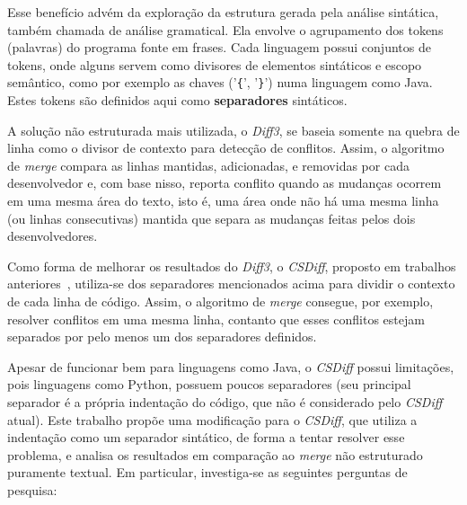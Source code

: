 Esse benefício advém da exploração da estrutura gerada pela análise sintática,
também chamada de análise gramatical. Ela envolve o agrupamento dos tokens
(palavras) do programa fonte em frases. Cada linguagem possui conjuntos de
tokens, onde alguns servem como divisores de elementos sintáticos e escopo
semântico, como por exemplo as chaves ('\verb|{|', '\verb|}|') numa linguagem como Java.
Estes tokens são definidos aqui como
\textbf{separadores} sintáticos.

A solução não estruturada mais utilizada, o \emph{Diff3}, se baseia somente na
quebra de linha como o divisor de contexto para detecção de conflitos. Assim, o
algoritmo de \emph{merge} compara as linhas mantidas, adicionadas, e removidas
por cada desenvolvedor e, com base nisso, reporta conflito quando as mudanças
ocorrem em uma mesma área do texto, isto é, uma área onde não há uma mesma
linha (ou linhas consecutivas) mantida que separa as mudanças feitas pelos dois
desenvolvedores.

Como forma de melhorar os resultados do \emph{Diff3}, o \emph{CSDiff}, proposto
em trabalhos anteriores~\cite{clem21}, utiliza-se dos separadores mencionados
acima para dividir o contexto de cada linha de código. Assim, o algoritmo de
\emph{merge} consegue, por exemplo, resolver conflitos em uma mesma linha,
contanto que esses conflitos estejam separados por pelo menos um dos
separadores definidos.

Apesar de funcionar bem para linguagens como Java, o \emph{CSDiff} possui
limitações, pois linguagens como Python, possuem poucos separadores (seu
principal separador é a própria indentação do código, que não é considerado
pelo \emph{CSDiff} atual). Este trabalho propõe uma modificação para o
\emph{CSDiff}, que utiliza a indentação como um separador sintático, de forma a
tentar resolver esse problema, e analisa os resultados em comparação ao
\emph{merge} não estruturado puramente textual. Em particular, investiga-se as
seguintes perguntas de pesquisa:

